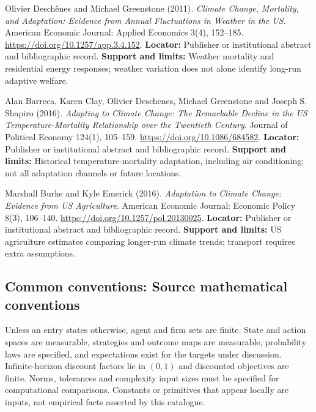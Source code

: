 \documentclass[11pt,a4paper]{article}
\begin{document}
\begin{enumerate}[label={[\textnormal{S}\arabic*]},leftmargin=*]

\item Olivier Deschênes and Michael Greenstone (2011). \emph{Climate Change, Mortality, and Adaptation: Evidence from Annual Fluctuations in Weather in the US}. American Economic Journal: Applied Economics 3(4), 152–185. \url{https://doi.org/10.1257/app.3.4.152}. \textbf{Locator:} Publisher or institutional abstract and bibliographic record. \textbf{Support and limits:} Weather mortality and residential energy responses; weather variation does not alone identify long-run adaptive welfare.

\item Alan Barreca, Karen Clay, Olivier Deschenes, Michael Greenstone and Joseph S. Shapiro (2016). \emph{Adapting to Climate Change: The Remarkable Decline in the US Temperature-Mortality Relationship over the Twentieth Century}. Journal of Political Economy 124(1), 105–159. \url{https://doi.org/10.1086/684582}. \textbf{Locator:} Publisher or institutional abstract and bibliographic record. \textbf{Support and limits:} Historical temperature-mortality adaptation, including air conditioning; not all adaptation channels or future locations.

\item Marshall Burke and Kyle Emerick (2016). \emph{Adaptation to Climate Change: Evidence from US Agriculture}. American Economic Journal: Economic Policy 8(3), 106–140. \url{https://doi.org/10.1257/pol.20130025}. \textbf{Locator:} Publisher or institutional abstract and bibliographic record. \textbf{Support and limits:} US agriculture estimates comparing longer-run climate trends; transport requires extra assumptions.

\end{enumerate}

\subsection*{Common conventions: Source mathematical conventions}

Unless an entry states otherwise, agent and firm sets are finite. State and action spaces are measurable, strategies and outcome maps are measurable, probability laws are specified, and expectations exist for the targets under discussion. Infinite-horizon discount factors lie in $(0,1)$ and discounted objectives are finite. Norms, tolerances and complexity input sizes must be specified for computational comparisons. Constants or primitives that appear locally are inputs, not empirical facts asserted by this catalogue.
\end{document}

